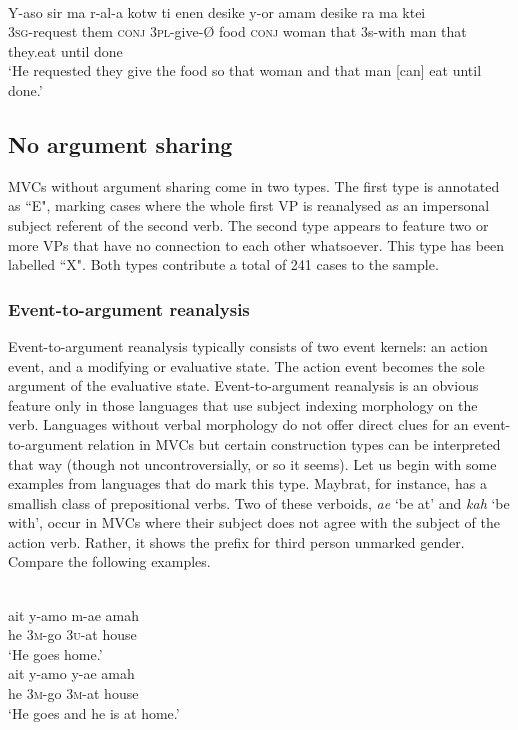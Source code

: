 \ea \label{selaru001o}
\\
\gll Y-aso sir ma r-al-a kotw ti enen desike y-or amam desike ra ma ktei \\
3\textsc{sg}-request them \textsc{conj} 3\textsc{pl}-give-Ø food \textsc{conj} woman that 3s-with man that they.eat until done \\
\glft `He requested they give the food so that woman and that man [can] eat until done.'\\ 
\z

\subsection{No argument sharing}

MVCs without argument sharing come in two types. The first type is annotated as ``E", marking cases where the whole first VP is reanalysed as an impersonal subject referent of the second verb. The second type appears to feature two or more VPs that have no connection to each other whatsoever. This type has been labelled ``X". Both types contribute a total of 241 cases to the sample.

\subsubsection{Event-to-argument reanalysis}\label{sec:event-to-argument}

Event-to-argument reanalysis typically consists of two event kernels: an action event, and a modifying or evaluative state. The action event becomes the sole argument of the evaluative state. Event-to-argument reanalysis is an obvious feature only in those languages that use subject indexing morphology on the verb. Languages without verbal morphology do not offer direct clues for an event-to-argument relation in MVCs but certain construction types can be interpreted that way (though not uncontroversially, or so it seems). Let us begin with some examples from languages that do mark this type. Maybrat, for instance, has a smallish class of prepositional verbs. Two of these verboids, \textit{ae} `be at' and \textit{kah} `be with', occur in MVCs where their subject does not agree with the subject of the action verb. Rather, it shows the prefix for third person unmarked gender. Compare the following examples.

\ea \label{maybrat002}
\\
\ea
\gll ait y-amo m-ae amah \\
he 3\textsc{m}-go 3\textsc{u}-at house \\
\glft `He goes home.' \\ 
\ex
\gll ait y-amo y-ae amah \\ 
he 3\textsc{m}-go 3\textsc{m}-at house \\
\glft `He goes and he is at home.'\\ 
\z
\z

